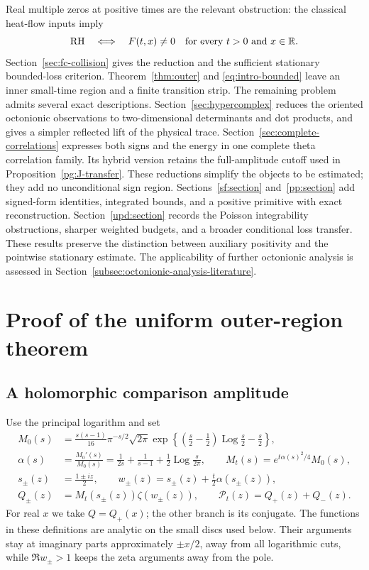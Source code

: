 \documentclass[11pt]{article}
\numberwithin{equation}{section}
\theoremstyle{definition}
\theoremstyle{remark}
\newcommand{\R}{\mathbb R}
\newcommand{\RH}{\mathrm{RH}}
\begin{document}
Real multiple zeros at positive times are the relevant obstruction:
the classical heat-flow inputs imply
\begin{equation}
 \RH\quad\Longleftrightarrow\quad
 F(t,x)\ne0\quad\hbox{for every }t>0\hbox{ and }x\in\R.
 \label{eq:intro-rh}
\end{equation}
Section~\ref{sec:fc-collision} gives the reduction and the sufficient
stationary bounded-loss criterion. Theorem~\ref{thm:outer} and
\eqref{eq:intro-bounded} leave an inner small-time region and a finite
transition strip. The remaining problem admits several exact descriptions.
Section~\ref{sec:hypercomplex} reduces the oriented octonionic observations
to two-dimensional determinants and dot products, and gives a simpler
reflected lift of the physical trace. Section~\ref{sec:complete-correlations}
expresses both signs and the energy in one complete theta correlation
family. Its hybrid version retains the full-amplitude cutoff used in
Proposition~\ref{pg:J-transfer}. These reductions simplify the objects
to be estimated; they add no unconditional sign region.
Sections~\ref{sf:section} and~\ref{pp:section} add signed-form identities,
integrated bounds, and a positive primitive with exact reconstruction.
Section~\ref{upd:section} records the Poisson integrability obstructions,
sharper weighted budgets, and a broader conditional loss transfer.
These results preserve the distinction between auxiliary positivity and
the pointwise stationary estimate. The applicability of further octonionic
analysis is assessed in Section~\ref{subsec:octonionic-analysis-literature}.

\section{Proof of the uniform outer-region theorem}\label{sec:outer-proof}

\subsection{A holomorphic comparison amplitude}
Use the principal logarithm and set
\begin{align}
 M_0(s)&=\frac{s(s-1)}{16}\pi^{-s/2}\sqrt{2\pi}
 \exp\left\{\left(\frac s2-\frac12\right)\operatorname{Log}\frac s2
                         -\frac s2\right\},\label{eq:M0}\\
 \alpha(s)&=\frac{M_0'(s)}{M_0(s)}
 =\frac{1}{2s}+\frac{1}{s-1}+\frac12\operatorname{Log}\frac{s}{2\pi},
 \qquad M_t(s)=e^{t\alpha(s)^2/4}M_0(s),\label{eq:alpha-Mt}\\
 s_\pm(z)&=\frac{1\pm iz}{2},\qquad
 w_\pm(z)=s_\pm(z)+\frac t2\alpha(s_\pm(z)),\label{eq:wpm}\\
 Q_\pm(z)&=M_t(s_\pm(z))\zeta(w_\pm(z)),\qquad
 \mathcal P_t(z)=Q_+(z)+Q_-(z).\label{eq:analytic-model}
\end{align}
For real $x$ we take $Q=Q_+(x)$; the other branch is its conjugate.
The functions in these definitions are analytic on the small discs
used below. Their arguments stay at imaginary parts approximately
$\pm x/2$, away from all logarithmic cuts, while $\Re w_\pm>1$ keeps
the zeta arguments away from the pole.
\end{document}
